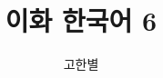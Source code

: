 \documentclass[a4paper, 11pt, oneside]{article}
\begin{document}
\begin{titlepage}

\title{이화 한국어 6}
\author{고한별}
\date{}
\maketitle
\end{titlepage}
\end{document}
